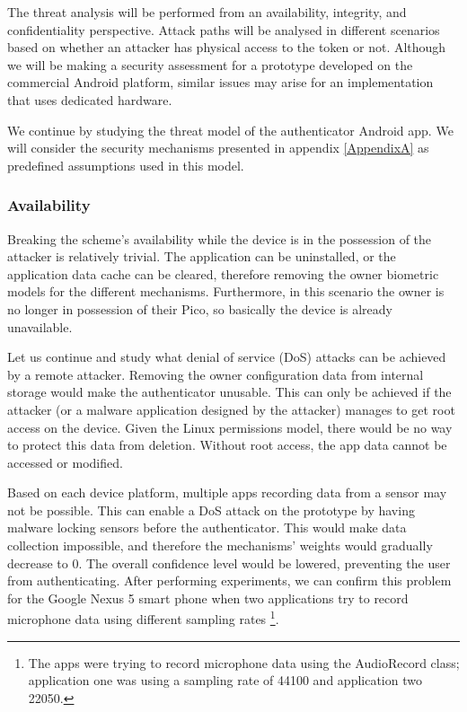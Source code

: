 The threat analysis will be performed from an availability, integrity, and confidentiality perspective. Attack paths will be analysed in different scenarios based on whether an attacker has physical access to the token or not. Although we will be making a security assessment for a prototype developed on the commercial Android platform, similar issues may arise for an implementation that uses dedicated hardware.

We continue by studying the threat model of the authenticator Android app. We will consider the security mechanisms presented in appendix \ref{AppendixA} as predefined assumptions used in this model.

\subsubsection*{Availability}
Breaking the scheme's availability while the device is in the possession of the attacker is relatively trivial. The application can be uninstalled, or the application data cache can be cleared, therefore removing the owner biometric models for the different mechanisms. Furthermore, in this scenario the owner is no longer in possession of their Pico, so basically the device is already unavailable.

Let us continue and study what denial of service (DoS) attacks can be achieved by a remote attacker. Removing the owner configuration data from internal storage would make the authenticator unusable. This can only be achieved if the attacker (or a malware application designed by the attacker) manages to get root access on the device. Given the Linux permissions model, there would be no way to protect this data from deletion. Without root access, the app data cannot be accessed or modified.

Based on each device platform, multiple apps recording data from a sensor may not be possible. This can enable a DoS attack on the prototype by having malware locking sensors before the authenticator. This would make data collection impossible, and therefore the mechanisms' weights would gradually decrease to 0. The overall confidence level would be lowered, preventing the user from authenticating. After performing experiments, we can confirm this problem for the Google Nexus 5 smart phone when two applications try to record microphone data using different sampling rates \footnote{The apps were trying to record microphone data using the AudioRecord class; application one was using a sampling rate of 44100 and application two 22050.}.

